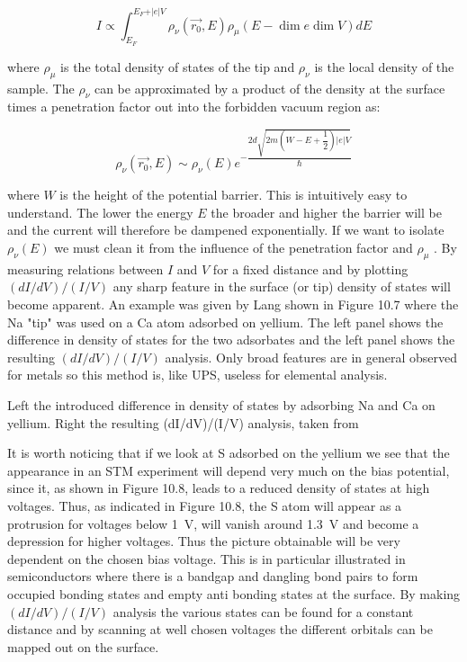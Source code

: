 \begin{equation}
I\propto\int_{E_F}^{E_F+\vert e\vert V}\rho_{\nu}(\vec{r_0},E)\rho_{\mu}(E-\dim e\dim V)dE
\end{equation}

\noindent where $\rho_{\mu}$ is the total density of states of the tip and $\rho_{\nu}$ is the local density of the sample. The $\rho_{\nu}$ can  be approximated by a product of the density at the surface times a penetration factor out into the forbidden vacuum region as:

\begin{equation}
\rho_{\nu}(\vec{r_0},E)\sim\rho_{\nu}(E)e^{-\dfrac{2d\sqrt{2m(W-E+\dfrac{1}{2})\vert e\vert V}}{\hbar}}
\end{equation}

\noindent where $W$ is the height of the potential barrier. This is intuitively easy to understand. The lower the energy $E$ the broader and higher the barrier will be and the current will therefore be dampened exponentially. If we want to isolate $\rho_{\nu}(E)$ we must clean it from the influence of the penetration factor and $\rho_{\mu}$ . By measuring relations between $I$ and $V$ for a fixed distance and by plotting  $(dI/dV)/(I/V)$ any sharp feature in the surface (or tip) density of states will become apparent. An example was given by Lang shown in Figure 10.7 where the Na "tip" was used on a Ca atom adsorbed on yellium. The left panel shows the difference in density of states for the two adsorbates and the left panel shows the resulting $(dI/dV)/(I/V)$ analysis. Only broad features are in general observed for metals so this method is, like UPS, useless for elemental analysis.

\vspace*{9cm}

 Left the introduced difference in density of states by adsorbing Na and Ca on yellium. Right the resulting (dI/dV)/(I/V) analysis, taken from \cite{Lang}

\vspace{1cm}  

It is worth noticing that if we look at S adsorbed on the yellium we see that the appearance in an STM experiment will depend very much on the bias potential, since it, as shown in Figure 10.8, leads to a reduced density of states at high voltages. Thus, as indicated in Figure 10.8, the S atom will appear as a protrusion for voltages below \SI{1}{V}, will vanish around \SI{1.3}{V} and become a depression for higher voltages. Thus the picture obtainable will be very dependent on the chosen bias voltage. This is in particular illustrated in semiconductors where there is a bandgap and dangling bond pairs to form occupied bonding states and empty anti bonding states at the surface. By making $(dI/dV)/(I/V)$ analysis the various states can be found for a constant distance and by scanning  at well chosen voltages the different orbitals can be mapped out on the surface.

